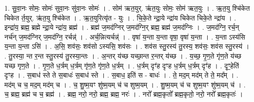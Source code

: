 \documentclass[17pt]{extarticle}
\begin{document}
1. सु॒वा॒नः सोमः॒ सोमः॑ सुवा॒नः सु॑वा॒नः सोमः॑ । . सोम॑ ऋत॒युर्. ऋ॑त॒युः सोमः॒ सोम॑ ऋत॒युः । . ऋ॒त॒यु श्चि॑केत चिकेत र्त॒युर्. ऋ॑त॒यु श्चि॑केत । . ऋ॒त॒युरित्यृ॑त - युः । . चि॒के॒ते न्द्रा॒ये न्द्रा॑य चिकेत चिके॒ते न्द्रा॑य । . इन्द्रा॑य॒ ब्रह्म॒ ब्रह्मे न्द्रा॒ये न्द्रा॑य॒ ब्रह्म॑ । . ब्रह्म॑ ज॒मद॑ग्निर् ज॒मद॑ग्नि॒र् ब्रह्म॒ ब्रह्म॑ ज॒मद॑ग्निः । . ज॒मद॑ग्नि॒ रर्च॒न् नर्च॑न् ज॒मद॑ग्निर् ज॒मद॑ग्नि॒ रर्चन्न्॑ । . अर्च॒न्नित्यर्चन्न्॑ । . वृषा॑ य॒न्ता य॒न्ता वृषा॒ वृषा॑ य॒न्ता । . य॒न्ता ऽस्य॑सि य॒न्ता य॒न्ता ऽसि॑ । . अ॒सि॒ शव॑सः॒ शव॑सो ऽस्यसि॒ शव॑सः । . शव॑स स्तु॒रस्य॑ तु॒रस्य॒ शव॑सः॒ शव॑स स्तु॒रस्य॑ । . तु॒रस्या॒ न्त र॒न्त स्तु॒रस्य॑ तु॒रस्या॒न्तः । . अ॒न्तर् य॑च्छ यच्छा॒न्त र॒न्तर् य॑च्छ । . य॒च्छ॒ गृ॒ण॒ते गृ॑ण॒ते य॑च्छ यच्छ गृण॒ते । . गृ॒ण॒ते ध॒र्त्रम् ध॒र्त्रम् गृ॑ण॒ते गृ॑ण॒ते ध॒र्त्रम् । . ध॒र्त्रम् दृꣳ॑ह दृꣳह ध॒र्त्रम् ध॒र्त्रम् दृꣳ॑ह । . दृꣳ॒॒हेति॑ दृꣳह । . स॒बाध॑ स्ते ते स॒बाधः॑ स॒बाध॑ स्ते । . स॒बाध॒ इति॑ स - बाधः॑ । . ते॒ मद॒म् मद॑म् ते ते॒ मद᳚म् । . मद॑म् च च॒ मद॒म् मद॑म् च । . च॒ शु॒ष्म॒यꣳ शु॑ष्म॒यम् च॑ च शुष्म॒यम् । . शु॒ष्म॒यम् च॑ च शुष्म॒यꣳ शु॑ष्म॒यम् च॑ । . च॒ ब्रह्म॒ ब्रह्म॑ च च॒ ब्रह्म॑ । . ब्रह्म॒ नरो॒ नरो॒ ब्रह्म॒ ब्रह्म॒ नरः॑ । . नरो᳚ ब्रह्म॒कृतो᳚ ब्रह्म॒कृतो॒ नरो॒ नरो᳚ ब्रह्म॒कृतः॑ । \newline
\end{document}
